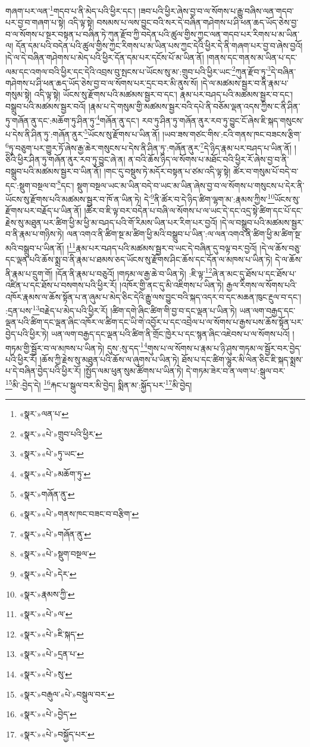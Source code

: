 གཞག་པར་ལན་\footnote{«སྣར་»ལན་པ་}གདབ་པ་ནི་མེད་པའི་ཕྱིར་དང་། །ཟབ་པའི་ཕྱིར་ཞེས་བྱ་བ་ལ་སོགས་པ་རྒྱུ་བཞིས་ལན་གདབ་པར་བྱ་བ་གཞག་པ་སྟེ། འདི་ལྟ་སྟེ། བསམས་པ་ལས་བྱུང་བའི་སར་དེ་བཞིན་གཤེགས་པ་ཤི་ཕན་ཆད་ཡོད་ཅེས་བྱ་བ་ལ་སོགས་པ་སྔར་བསྟན་པ་བཞིན་ཏེ་ཀུན་རྫོབ་ཀྱི་བདེན་པའི་ཚུལ་གྱིས་ཀྱང་ལན་གདབ་པར་རིགས་པ་མ་ཡིན་ལ། དོན་དམ་པའི་བདེན་པའི་ཚུལ་གྱིས་ཀྱང་རིགས་པ་མ་ཡིན་པས་ཀྱང་དེའི་ཕྱིར་དེ་ནི་གཞག་པར་བྱ་བ་ཞེས་བྱའོ། །དེ་ལ་དེ་བཞིན་གཤེགས་པ་མེད་པའི་ཕྱིར་དོན་དམ་པར་དངོས་པོ་མ་ཡིན་ནོ། །གནས་དང་གནས་མ་ཡིན་པ་དང་ལམ་དང་འགལ་བའི་ཕྱིར་དང་དེའི་འབྲས་བུ་སྤངས་པ་ཡོངས་སུ་མ་:གྲུབ་པའི་ཕྱིར་ཡང་\footnote{«སྣར་»«པེ་»གྲུབ་པའི་ཕྱིར་}ཀུན་རྫོབ་ཏུ་\footnote{«སྣར་»«པེ་»ཏུ་ཡང་}དེ་བཞིན་གཤེགས་པ་ཤི་ཕན་ཆད་ཡོད་ཅེས་བྱ་བ་ལ་སོགས་པར་དྲང་བར་མི་ནུས་སོ། །དེ་ལ་མཚམས་སྦྱར་བ་ནི་རྣམ་པ་གསུམ་སྟེ། འདི་ལྟ་སྟེ། ཡོངས་སུ་རྫོགས་པའི་མཚམས་སྦྱར་བ་དང་། རྣམ་པར་བཤད་པའི་མཚམས་སྦྱར་བ་དང་། བསྒྲུབ་པའི་མཚམས་སྦྱར་བའོ། །རྣམ་པ་དེ་གསུམ་གྱི་མཚམས་སྦྱར་བའི་དཔེ་ནི་བཅོམ་ལྡན་འདས་ཀྱིས་ང་ནི་ཤིན་ཏུ་གཞོན་ནུ་དང་:མཆོག་ཏུ་ཤིན་ཏུ་\footnote{«སྣར་»«པེ་»མཆོག་ཏུ་}གཞོན་ནུ་དང་། རབ་ཏུ་ཤིན་ཏུ་གཞོན་ནུར་རབ་ཏུ་བྱུང་ངོ་ཞེས་ཇི་སྐད་གསུངས་པ་དེས་ནི་ཤིན་ཏུ་:གཞོན་ནུར་\footnote{«སྣར་»གཞོན་ནུ་}ཡོངས་སུ་རྫོགས་པ་ཡིན་ནོ། །ཡབ་ཟས་གཙང་གིས་:ངའི་གནས་ཁང་བཟངས་རྩིག་\footnote{«སྣར་»«པེ་»གནས་ཁང་བཟང་བ་བརྩིག་}ཏུ་བཅུག་པར་གྱུར་ཏོ་ཞེས་རྒྱ་ཆེར་གསུངས་པ་དེས་ནི་ཤིན་ཏུ་:གཞོན་ནུར་\footnote{«སྣར་»«པེ་»གཞོན་ནུ་}དེ་ཉིད་རྣམ་པར་བཤད་པ་ཡིན་ནོ། །ཅིའི་ཕྱིར་ཤིན་ཏུ་གཞོན་ནུར་རབ་ཏུ་བྱུང་ཞེ་ན། ན་བའི་ཆོས་ཉིད་ལ་སོགས་པ་མཐོང་བའི་ཕྱིར་རོ་ཞེས་བྱ་བ་ནི་བསྒྲུབ་པའི་མཚམས་སྦྱར་བ་ཡིན་ནོ། །གང་དུ་བསྡུས་ཏེ་མདོར་བསྟན་པ་ཙམ་འདི་ལྟ་སྟེ། ཚོར་བ་གསུམ་པོ་བདེ་བ་དང་:སྡུག་བསྔལ་བ་\footnote{«སྣར་»«པེ་»སྡུག་བསྔལ་}དང་། སྡུག་བསྔལ་ཡང་མ་ཡིན་བདེ་བ་ཡང་མ་ཡིན་ཞེས་བྱ་བ་ལ་སོགས་པ་གསུངས་པ་དེར་ནི་ཡོངས་སུ་རྫོགས་པའི་མཚམས་སྦྱར་བ་ཁོ་ན་ཡིན་ཏེ། དེ་\footnote{«སྣར་»«པེ་»དེར་}ནི་ཚོར་བ་དེ་ཉིད་ཚིག་ལྷག་མ་:རྣམས་ཀྱིས་\footnote{«སྣར་»རྣམས་ཀྱི་}ཡོངས་སུ་རྫོགས་པར་བརྗོད་པ་ཡིན་ནོ། །ཚོར་བ་ཇི་ལྟ་བར་བདེན་པ་བཞི་ལ་སོགས་པ་ལ་ཡང་དེ་དང་འདྲ་སྟེ་ཚིག་དང་པོ་དང་རྗེས་སུ་མཐུན་པར་ཚིག་ཕྱི་མ་ཕྱི་མ་བཤད་པའི་གོ་རིམས་ཡིན་པར་རིག་པར་བྱའོ། །དེ་ལ་བསྒྲུབ་པའི་མཚམས་སྦྱར་བ་ནི་རྣམ་པ་གཉིས་ཏེ། ལན་འགའ་ནི་ཚིག་སྔ་མ་ཚིག་ཕྱི་མའི་བསྒྲུབ་པ་ཡིན་:ལ་ལན་འགའ་ནི་ཚིག་ཕྱི་མ་ཚིག་སྔ་མའི་བསྒྲུབ་པ་ཡིན་ནོ། །\footnote{«སྣར་»«པེ་»ལ་}རྣམ་པར་བཤད་པའི་མཚམས་སྦྱར་བ་ཡང་དེ་བཞིན་དུ་བལྟ་བར་བྱའོ། །དེ་ལ་ཆོས་བཅུ་དང་ལྡན་པའི་ཆོས་སྨྲ་བ་ནི་རྣམ་པ་ཐམས་ཅད་ཡོངས་སུ་རྫོགས་ཤིང་ཆོས་དང་དོན་ལ་མཁས་པ་ཡིན་ཏེ། དེ་ལ་ཆོས་ནི་རྣམ་པ་དྲུག་གོ། །དོན་ནི་རྣམ་པ་བཅུའོ། །གཏམ་ལ་རྒྱ་ཆེ་བ་ཡིན་ཏེ། :ཇི་ལྟ་\footnote{«སྣར་»«པེ་»ཇི་སྐད་}ཞེ་ན་མང་དུ་ཐོས་པ་དང་ཐོས་པ་འཛིན་པ་དང་ཐོས་པ་བསགས་པའི་ཕྱིར་རོ། །འཁོར་གྱི་ནང་དུ་མི་འཇིགས་པ་ཡིན་ཏེ། རྒྱལ་རིགས་ལ་སོགས་པའི་འཁོར་རྣམས་ལ་ཆོས་སྟོན་པ་ན་ཞུམ་པ་མེད་ཅིང་དེའི་རྒྱུ་ལས་བྱུང་བའི་སྐད་འདར་བ་དང་མཆན་ཁུང་རྔུལ་བ་དང་། :དྲན་པས་\footnote{«སྣར་»«པེ་»དྲན་པ་}བརྗེད་པ་མེད་པའི་ཕྱིར་རོ། །ཚིག་དགེ་ཞིང་ཚིག་གི་བྱ་བ་དང་ལྡན་པ་ཡིན་ཏེ། ཡན་ལག་བརྒྱད་དང་ལྡན་པའི་ཚིག་དང་ལྡན་ཞིང་འཁོར་ལ་ཚིག་དང་ཡི་གེ་འབྱོར་པ་དང་འབྲེལ་པ་ལ་སོགས་པ་རྒྱས་པས་ཆོས་སྟོན་པར་བྱེད་པའི་ཕྱིར་ཏེ། ཡན་ལག་བརྒྱད་དང་ལྡན་པའི་ཚིག་ནི་གྲོང་ཁྱེར་པ་དང་སྙན་ཞིང་འཇེབས་པ་ལ་སོགས་པའོ། །གཏམ་གྱི་སྦྱོར་བ་ལ་མཁས་པ་ཡིན་ཏེ། དུས་:སུ་དད་\footnote{«སྣར་»«པེ་»སུ་}གུས་པ་ལ་སོགས་པ་རྣམ་པ་ཉི་ཤུས་གཏམ་ལ་སྦྱོར་བར་བྱེད་པའི་ཕྱིར་རོ། །ཆོས་ཀྱི་རྗེས་སུ་མཐུན་པའི་ཆོས་ལ་ཞུགས་པ་ཡིན་ཏེ། ཐོས་པ་དང་ཚིག་ལྷུར་མི་ལེན་ཅིང་ཇི་སྐད་སྨྲས་པ་དེ་བཞིན་བྱེད་པའི་ཕྱིར་རོ། །སྤྱོད་ལམ་ཕུན་སུམ་ཚོགས་པ་ཡིན་ཏེ། དེ་གཏམ་ཟེར་བ་ན་ལག་པ་:སྒུལ་བར་\footnote{«སྣར་»བརྒུལ་«པེ་»བསྒུལ་བར་}མི་:བྱེད་དེ། \footnote{«སྣར་»«པེ་»བྱེད་}རྐང་པ་སྒུལ་བར་མི་བྱེད། སྨིན་མ་:སྐྱོད་པར་\footnote{«སྣར་»«པེ་»བསྐྱོད་པར་}མི་བྱེད། 